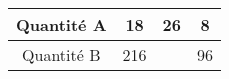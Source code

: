 \begin{tabular}{|c|c|c|c|}
\hline
Quantité A & 18 & 26 & 8 \\ \hline
Quantité B & 216 & \kern1cm & 96 \\ \hline
\end{tabular}

